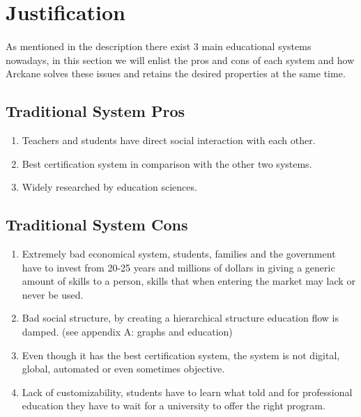
\section{Justification}\label{justification}

\paragraph{} As mentioned in the description there exist 3 main educational systems nowadays, in this section we will enlist the pros and cons of each system and how Arckane solves these issues and retains the desired properties at the same time.

\subsection{Traditional System Pros}
\begin{enumerate}
\item Teachers and students have direct social interaction with each other.
\item Best certification system in comparison with the other two systems.
\item Widely researched by education sciences.
\end{enumerate} 

\subsection{Traditional System Cons}
\begin{enumerate}
\item Extremely bad economical system, students, families and the government have to invest from 20-25 years and millions of dollars in giving a generic amount of skills to a person, skills that when entering the market may lack or never be used. 
\item Bad social structure, by creating a hierarchical structure education flow is damped. (see appendix A: graphs and education)
\item Even though it has the best certification system, the system is not digital, global, automated or even sometimes objective.
\item Lack of customizability, students have to learn what told and for professional education they have to wait for a university to offer the right program.
\end{enumerate} 

